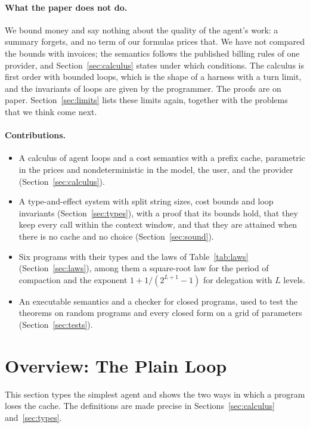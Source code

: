 \documentclass[acmsmall,nonacm,screen]{acmart}
\begin{document}
\paragraph{What the paper does not do.} We bound money and say nothing about the quality of
the agent's work: a summary forgets, and no term of our formulas prices that. We have not
compared the bounds with invoices; the semantics follows the published billing rules of one
provider, and Section~\ref{sec:calculus} states under which conditions. The calculus is first
order with bounded loops, which is the shape of a harness with a turn limit, and the
invariants of loops are given by the programmer. The proofs are on paper.
Section~\ref{sec:limits} lists these limits again, together with the problems that we think
come next.

\paragraph{Contributions.}
\begin{itemize}
\item A calculus of agent loops and a cost semantics with a prefix cache, parametric in the
prices and nondeterministic in the model, the user, and the provider
(Section~\ref{sec:calculus}).
\item A type-and-effect system with split string sizes, cost bounds and loop invariants
(Section~\ref{sec:types}), with a proof that its bounds hold, that they keep every call within
the context window, and that they are attained when there is no cache and no choice
(Section~\ref{sec:sound}).
\item Six programs with their types and the laws of Table~\ref{tab:laws}
(Section~\ref{sec:laws}), among them a square-root law for the period of compaction and the
exponent $1 + 1/(2^{L+1}-1)$ for delegation with $L$ levels.
\item An executable semantics and a checker for closed programs, used to test the theorems on
random programs and every closed form on a grid of parameters (Section~\ref{sec:tests}).
\end{itemize}

\section{Overview: The Plain Loop}
\label{sec:overview}

This section types the simplest agent and shows the two ways in which a program loses the
cache. The definitions are made precise in Sections~\ref{sec:calculus} and~\ref{sec:types}.
\end{document}
